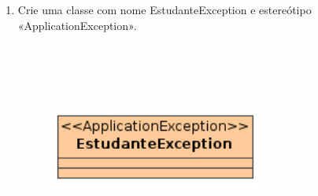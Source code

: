 \begin{enumerate}
	\item Crie uma classe com nome EstudanteException e estereótipo
	«ApplicationException».
		\begin{figure}[!htb]
			\centering
			\includegraphics[width=200pt,height=200pt]{imgs/tutorial-mdarte-0010.png}
		\end{figure}
\end{enumerate}
